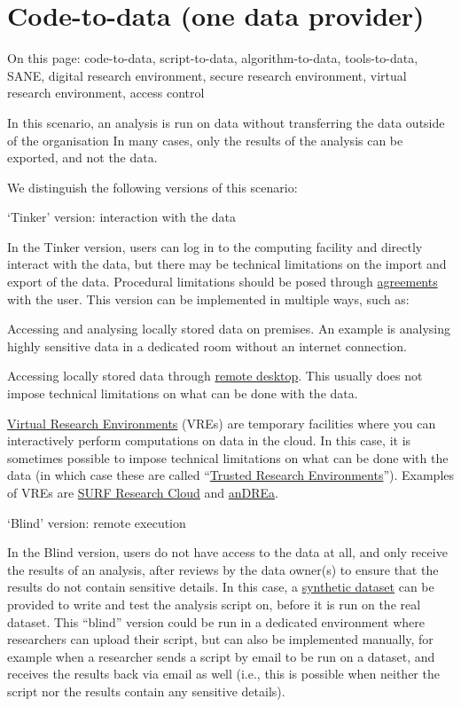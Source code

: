 \documentclass[
]{book}
\begin{document}
\hypertarget{code-to-data}{%
\section{Code-to-data (one data provider)}\label{code-to-data}}

On this page: code-to-data, script-to-data, algorithm-to-data, tools-to-data,
SANE, digital research environment, secure research environment, virtual
research environment, access control

In this scenario, an analysis is run on data without transferring the data
outside of the organisation In many cases, only the results of the analysis
can be exported, and not the data.

We distinguish the following versions of this scenario:

`Tinker' version: interaction with the data

In the Tinker version, users can log in to the computing facility and directly
interact with the data, but there may be technical limitations on the import and
export of the data. Procedural limitations should be posed through
\protect\hyperlink{agreements}{agreements} with the user. This version can be implemented in
multiple ways, such as:

Accessing and analysing locally stored data on premises. An example is
analysing highly sensitive data in a dedicated room without an internet
connection.

Accessing locally stored data through
\href{https://manuals.uu.nl/en/manual/solisworkspace-faq/}{remote desktop}.
This usually does not impose technical limitations on what can be done with
the data.

\href{https://www.uu.nl/en/research/research-data-management/tools-services/software-and-computing/virtual-research-environments}{Virtual Research Environments}
(VREs) are temporary facilities where you can interactively perform
computations on data in the cloud. In this case, it is sometimes possible to
impose technical limitations on what can be done with the data (in which case
these are called
``\href{https://the-turing-way.netlify.app/project-design/sdpw/trew.html}{Trusted Research Environments}'').
Examples of VREs are
\href{https://www.surf.nl/en/surf-research-cloud-collaboration-portal-for-research}{SURF Research Cloud}
and \href{https://www.andrea-cloud.eu/}{anDREa}.

`Blind' version: remote execution

In the Blind version, users do not have access to the data
at all, and only receive the results of an analysis, after reviews by the data
owner(s) to ensure that the results do not contain sensitive details. In this
case, a \protect\hyperlink{synthetic-data}{synthetic dataset} can be provided to write and test
the analysis script on, before it is run on the real dataset. This ``blind''
version could be run in a dedicated environment where researchers can upload
their script, but can also be implemented manually, for example when a
researcher sends a script by email to be run on a dataset, and receives the
results back via email as well (i.e., this is possible when neither the script
nor the results contain any sensitive details).
\end{document}
